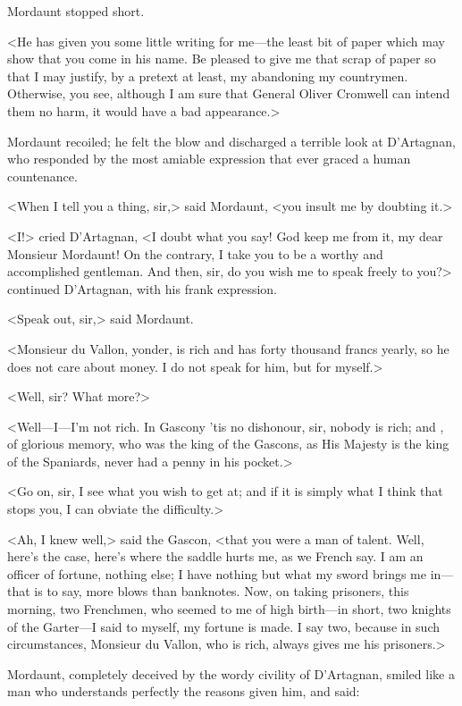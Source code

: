 Mordaunt stopped short.

<He has given you some little writing for me—the least bit of paper which may show that you come in his name. Be pleased to give me that scrap of paper so that I may justify, by a pretext at least, my abandoning my countrymen. Otherwise, you see, although I am sure that General Oliver Cromwell can intend them no harm, it would have a bad appearance.>

Mordaunt recoiled; he felt the blow and discharged a terrible look at D'Artagnan, who responded by the most amiable expression that ever graced a human countenance.

<When I tell you a thing, sir,> said Mordaunt, <you insult me by doubting it.>

<I\@!> cried D'Artagnan, <I doubt what you say! God keep me from it, my dear Monsieur Mordaunt! On the contrary, I take you to be a worthy and accomplished gentleman. And then, sir, do you wish me to speak freely to you?> continued D'Artagnan, with his frank expression.

<Speak out, sir,> said Mordaunt.

<Monsieur du Vallon, yonder, is rich and has forty thousand francs yearly, so he does not care about money. I do not speak for him, but for myself.>

<Well, sir? What more?>

<Well—I—I'm not rich. In Gascony 'tis no dishonour, sir, nobody is rich; and , of glorious memory, who was the king of the Gascons, as His Majesty  is the king of the Spaniards, never had a penny in his pocket.>

<Go on, sir, I see what you wish to get at; and if it is simply what I think that stops you, I can obviate the difficulty.>

<Ah, I knew well,> said the Gascon, <that you were a man of talent. Well, here's the case, here's where the saddle hurts me, as we French say. I am an officer of fortune, nothing else; I have nothing but what my sword brings me in—that is to say, more blows than banknotes. Now, on taking prisoners, this morning, two Frenchmen, who seemed to me of high birth—in short, two knights of the Garter—I said to myself, my fortune is made. I say two, because in such circumstances, Monsieur du Vallon, who is rich, always gives me his prisoners.>

Mordaunt, completely deceived by the wordy civility of D'Artagnan, smiled like a man who understands perfectly the reasons given him, and said:

